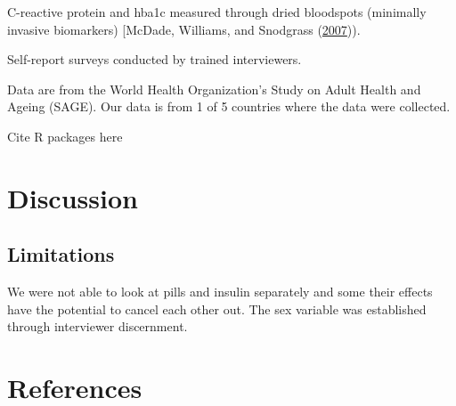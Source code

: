 \documentclass[
  man,floatsintext]{apa6}
\begin{document}
C-reactive protein and hba1c measured through dried bloodspots (minimally invasive biomarkers) {[}McDade, Williams, and Snodgrass (\protect\hyperlink{ref-10.1353ux2fdem.2007.0038}{2007})).

Self-report surveys conducted by trained interviewers.

Data are from the World Health Organization's Study on Adult Health and Ageing (SAGE). Our data is from 1 of 5 countries where the data were collected.

Cite R packages here

\hypertarget{discussion}{%
\section{Discussion}\label{discussion}}

\hypertarget{limitations}{%
\subsection{Limitations}\label{limitations}}

We were not able to look at pills and insulin separately and some their effects have the potential to cancel each other out. The sex variable was established through interviewer discernment.

\hypertarget{references}{%
\section*{References}\label{references}}
\end{document}
